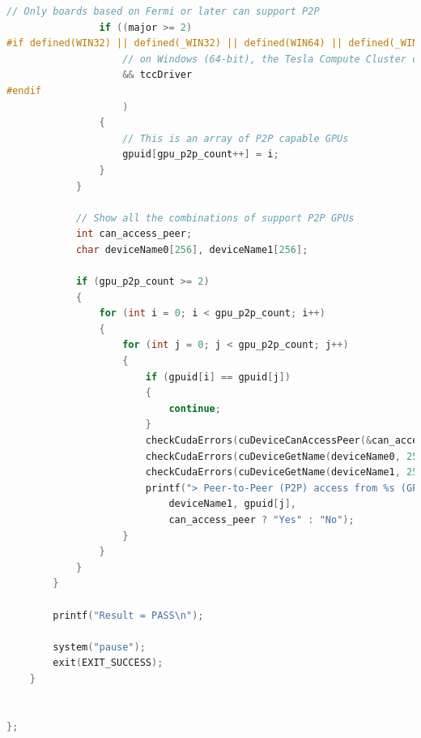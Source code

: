 \documentclass{scrreprt}
\begin{document}
\begin{lstlisting}[language=C++, caption=deviceQueryDrv.h]
				// Only boards based on Fermi or later can support P2P
				if ((major >= 2)
#if defined(WIN32) || defined(_WIN32) || defined(WIN64) || defined(_WIN64)
					// on Windows (64-bit), the Tesla Compute Cluster driver for windows must be enabled to support this
					&& tccDriver
#endif
					)
				{
					// This is an array of P2P capable GPUs
					gpuid[gpu_p2p_count++] = i;
				}
			}

			// Show all the combinations of support P2P GPUs
			int can_access_peer;
			char deviceName0[256], deviceName1[256];

			if (gpu_p2p_count >= 2)
			{
				for (int i = 0; i < gpu_p2p_count; i++)
				{
					for (int j = 0; j < gpu_p2p_count; j++)
					{
						if (gpuid[i] == gpuid[j])
						{
							continue;
						}
						checkCudaErrors(cuDeviceCanAccessPeer(&can_access_peer, gpuid[i], gpuid[j]));
						checkCudaErrors(cuDeviceGetName(deviceName0, 256, gpuid[i]));
						checkCudaErrors(cuDeviceGetName(deviceName1, 256, gpuid[j]));
						printf("> Peer-to-Peer (P2P) access from %s (GPU%d) -> %s (GPU%d) : %s\n", deviceName0, gpuid[i],
							deviceName1, gpuid[j],
							can_access_peer ? "Yes" : "No");
					}
				}
			}
		}

		printf("Result = PASS\n");

		system("pause");
		exit(EXIT_SUCCESS);
	}


};




\end{lstlisting}
\end{document}
